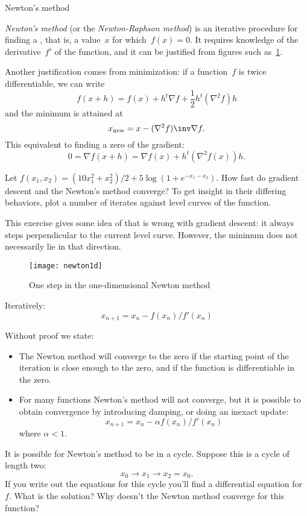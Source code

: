  {Newton's method}

\emph{Newton's method}
%
(or the
\emph{Newton-Raphson method})
%
is an iterative
procedure for finding a , that is, a
value~$x$ for which~$f(x)=0$. It requires knowledge of the derivative~$f'$
of the function, and it can be justified from figures such
as~\ref{fig:newton1d}.

Another justification comes from minimization: if a function~$f$ is
twice differentiable, we can write
\[ f(x+h) = f(x) + h^t\nabla f + \frac12 h^t(\nabla^2f) h \]
and the minimum is attained at
\[ x_{\scriptstyle\mathrm{new}} = x - (\nabla^2f)\inv \nabla f. \]
This equivalent to finding a zero of the gradient:
\[ 0=\nabla f(x+h) = \nabla f(x)+h^t(\nabla^2f(x))h. \]

\begin{exercise}
  Let $f(x_1,x_2) = (10x_1^2+x_2^2)/2 + 5\log(1+e^{-x_1-x_2})$.
  How fast do gradient descent and the Newton's method converge?
  To get insight in their differing behaviors, plot a number of
  iterates against level curves of the function.
\end{exercise}

This exercise gives some idea of that is wrong with gradient descent:
it always steps perpendicular to the current level curve. However, the
minimum does not necessarily lie in that direction.

\begin{figure}[ht]
  \texttt{[image: newton1d]}
  \caption{One step in the one-dimensional Newton method}
  \label{fig:newton1d}
\end{figure}

Iteratively:
\[ x_{n+1} = x_n-f(x_n)/f'(x_n) \]

Without proof we state:
\begin{itemize}
\item The Newton method will converge to the zero if the starting
  point of the iteration is close enough to the zero, and if the
  function is differentiable in the zero.
\item For many functions Newton's method will not converge, but it is
  possible to obtain convergence by introducing damping,
  or doing an inexact update:
  \[ x_{n+1} = x_n-\alpha f(x_n)/f'(x_n) \]
  where $\alpha<1$.
\end{itemize}

\begin{exercise}
  It is possible for Newton's method to be in a cycle. Suppose this is
  a cycle of length two: \[ x_0\rightarrow x_1 \rightarrow x_2=x_0. \]
  If you write out the equations for this cycle you'll find a
  differential equation for~$f$. What is the solution? Why doesn't the
  Newton method converge for this function?
\end{exercise}

